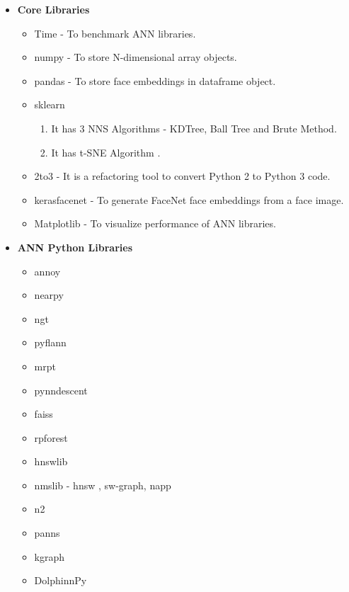 \documentclass[12pt]{article}
\renewcommand{\_}{\kern-1.5pt\textunderscore\kern-1.5pt}
\begin{document}
\begin{itemize}
	\item \textbf{Core Libraries}
    \begin{itemize}
    	\item Time - To benchmark ANN libraries.
    	\item numpy - To store N-dimensional array objects.
    	\item pandas - To store face embeddings in dataframe object.
    	\item sklearn
    	    \begin{enumerate}
    	        \item It has 3 NNS Algorithms - KDTree, Ball Tree and Brute Method.
    	        \item It has t-SNE Algorithm \cite{maaten2008visualizing} . 
    	    \end{enumerate}
    	\item 2to3 - It is a refactoring tool to convert Python 2 to Python 3 code.
    	\item keras\_facenet - To generate FaceNet face embeddings from a face image.
    	\item Matplotlib - To visualize performance of ANN libraries.
    \end{itemize}
	\item \textbf{ANN Python Libraries }
    \begin{itemize}
    	\item annoy \cite{annoy}
    	\item nearpy \cite{lshhashes}
    	\item ngt \cite{Iwasaki2016PrunedBK,iwasaki2018optimization}
    	\item pyflann \cite{muja2009flann}
    	\item mrpt \cite{hyvonen2015fast}
    	\item pynndescent \cite{dong2011efficient}
    	\item faiss \cite{JDH17}
    	\item rpforest \cite{inproceedings}
    	\item hnswlib \cite{malkov2018efficient}
    	\item nmslib - hnsw \cite{malkov2018efficient}, sw-graph, napp \cite{tellez2011succinct}
    	\item n2 \cite{malkov2018efficient}
    	\item panns \cite{panns}
    	\item kgraph \cite{dong2011efficient}
    	\item DolphinnPy \cite{dolphinn}

\end{itemize}
\end{itemize}
\end{document}
